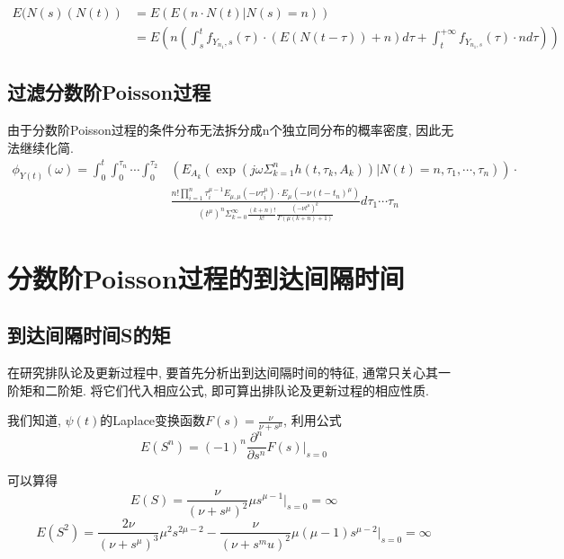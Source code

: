 \documentclass[a4paper, 12pt]{ctexart}
\begin{document}
\begin{equation}
\begin{split}
E(N(s)(N(t))&=E(E(n\cdot N(t)|N(s)=n))\\
&=E(n(\int_s^t f_{Y_{n_1},s}(\tau)\cdot(E(N(t-\tau))+n)d\tau+\int_t^{+\infty}f_{Y_{n_1,s}}(\tau)\cdot n d\tau))
\end{split}
\end{equation}

\subsection{过滤分数阶Poisson过程}
由于分数阶Poisson过程的条件分布无法拆分成n个独立同分布的概率密度, 因此无法继续化简.
\begin{equation}
\begin{split}
\phi _{Y(t)}(\omega)=\int_0^t\int_0^{\tau_n}\cdots\int_0^{\tau_2}&(E_{A_k}(\exp(j\omega \Sigma_{k=1}^n h(t,\tau_k,A_k))|N(t)=n,\tau_1,\cdots,\tau_n))\cdot\\
&\frac{n!\prod _{i=1}^{n} \tau _i^{\mu -1}E_{\mu ,  \mu}(-\nu \tau _i ^{\mu}) \cdot E_{\mu}(-\nu (t-t_n)^{\mu})}{(t^{\mu})^n \Sigma _{k=0}^{\infty}\frac{(k+n)!}{k!}\frac{(-\nu t^{\mu})^k}{\Gamma (\mu (k+n)+1)}} d\tau_1\cdots\tau_n
\end{split}
\end{equation}


\section{分数阶Poisson过程的到达间隔时间}
\subsection{到达间隔时间S的矩}

在研究排队论及更新过程中,  要首先分析出到达间隔时间的特征, 通常只关心其一阶矩和二阶矩.   将它们代入相应公式,   即可算出排队论及更新过程的相应性质. 

我们知道,   $\psi (t)$的Laplace变换函数$F(s)=\frac {\nu} {\nu + s^{\mu}}$,   利用公式
\begin{equation}
E(S^n)=(-1)^n\frac{\partial^n}{\partial s^n} F(s)\bigg|_{s=0}
\end{equation}

可以算得
\begin{equation}
E(S)=\frac{\nu}{(\nu+s^\mu)^2}\mu s^{\mu -1}\bigg|_{s=0}=\infty
\end{equation}
\begin{equation}
E(S^2)=\frac{2\nu}{(\nu +s^\mu)^3} \mu^2 s^{2\mu -2}-\frac{\nu}{(\nu+s^mu)^2} \mu(\mu -1)s^{\mu -2 }\bigg|_{s=0}=\infty
\end{equation}
\end{document}
